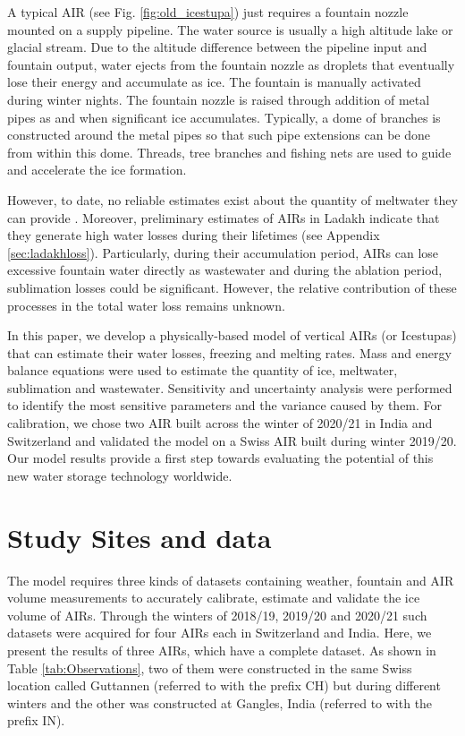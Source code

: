 \documentclass[utf8]{frontiersSCNS}
\begin{document}
A typical AIR (see Fig. \ref{fig:old_icestupa}) just requires a fountain nozzle mounted on a supply pipeline.
The water source is usually a high altitude lake or glacial stream. Due to the altitude difference between the
pipeline input and fountain output, water ejects from the fountain nozzle as droplets that eventually lose their
energy and accumulate as ice. The fountain is manually activated during winter nights. The fountain nozzle is
raised through addition of metal pipes as and when significant ice accumulates.  Typically, a dome of branches
is constructed around the metal pipes so that such pipe extensions can be done from within this dome.  Threads,
tree branches and fishing nets are used to guide and accelerate the ice formation.

However, to date, no reliable estimates exist about the quantity of meltwater they can provide
\citep{Nusser_2018} . Moreover, preliminary estimates of AIRs in Ladakh indicate that they generate high water
losses during their lifetimes (see Appendix \ref{sec:ladakhloss}). Particularly, during their accumulation
period, AIRs can lose excessive fountain water directly as wastewater and during the ablation period, sublimation
losses could be significant.  However, the relative contribution of these processes in the total water loss
remains unknown.

In this paper, we develop a physically-based model of vertical AIRs (or Icestupas) that can estimate their water
losses, freezing and melting rates. Mass and energy balance equations were used to estimate the quantity of
ice, meltwater, sublimation and wastewater. Sensitivity and uncertainty analysis were performed to identify the
most sensitive parameters and the variance caused by them. For calibration, we chose two AIR built across the
winter of 2020/21 in India and Switzerland and validated the model on a Swiss AIR built during winter 2019/20. Our model
results provide a first step towards evaluating the potential of this new water storage technology worldwide.

\section{Study Sites and data}

The model requires three kinds of datasets containing weather, fountain and AIR volume measurements to
accurately calibrate, estimate and validate the ice volume of AIRs. Through the winters of 2018/19, 2019/20 and
2020/21 such datasets were acquired for four AIRs each in Switzerland and India. Here, we present the results of
three AIRs, which have a complete dataset. As shown in Table \ref{tab:Observations}, two of them were
constructed in the same Swiss location called Guttannen (referred to with the prefix CH) but during different
winters and the other was constructed at Gangles, India (referred to with the prefix IN).
\end{document}
